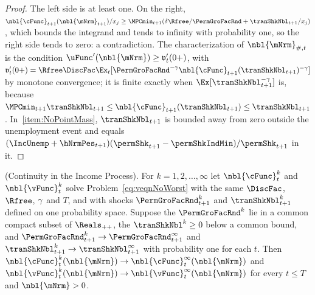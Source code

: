 \documentclass[\econtexRoot/BufferStockTheory]{subfiles}
\begin{document}
\begin{proof}
The left side is at least one.
On the right, $\nbl{\cFunc}_{t+1}(\nbl{\mNrm}_{t+1})/x_{j}\geq\MPCmin_{t+1}(\delta\Rfree/\PermGroFacRnd+\tranShkNbl_{t+1}/x_{j})$, which bounds the integrand and tends to infinity with probability one, so the right side tends to zero: a contradiction.
The characterization of $\nbl{\mNrm}_{\#,t}$ is the condition $\uFunc^{\prime}(\nbl{\mNrm})\geq\mathfrak{v}_{t}^{\prime}(0+)$, with $\mathfrak{v}_{t}^{\prime}(0+)=\Rfree\DiscFac\Ex_{t}[\PermGroFacRnd^{-\CRRA}\nbl{\cFunc}_{t+1}(\tranShkNbl_{t+1})^{-\CRRA}]$ by monotone convergence; it is finite exactly when $\Ex[\tranShkNbl_{t+1}^{-\CRRA}]$ is, because $\MPCmin_{t+1}\tranShkNbl_{t+1}\leq\nbl{\cFunc}_{t+1}(\tranShkNbl_{t+1})\leq\tranShkNbl_{t+1}$.
In~\ref{item:NoPointMass}, $\tranShkNbl_{t+1}$ is bounded away from zero outside the unemployment event and equals $(\IncUnemp+\hNrmPes_{t+1})(\permShk_{t+1}-\permShkIndMin)/\permShk_{t+1}$ in it.
\end{proof}

\begin{lemma}(Continuity in the Income Process).\label{lemma:ContinuityIncome}
For $k=1,2,\ldots,\infty$ let $\nbl{\cFunc}_{t}^{k}$ and $\nbl{\vFunc}_{t}^{k}$ solve Problem~\eqref{eq:veqnNoWorst} with the same $\DiscFac$, $\Rfree$, $\gamma$ and $T$, and with shocks $\PermGroFacRnd_{t+1}^{k}$ and $\tranShkNbl_{t+1}^{k}$ defined on one probability space.
Suppose the $\PermGroFacRnd^{k}$ lie in a common compact subset of $\Reals_{++}$, the $\tranShkNbl^{k}\geq 0$ below a common bound, and $\PermGroFacRnd_{t+1}^{k}\rightarrow\PermGroFacRnd_{t+1}^{\infty}$ and $\tranShkNbl_{t+1}^{k}\rightarrow\tranShkNbl_{t+1}^{\infty}$ with probability one for each $t$.
Then $\nbl{\cFunc}_{t}^{k}(\nbl{\mNrm})\rightarrow\nbl{\cFunc}_{t}^{\infty}(\nbl{\mNrm})$ and $\nbl{\vFunc}_{t}^{k}(\nbl{\mNrm})\rightarrow\nbl{\vFunc}_{t}^{\infty}(\nbl{\mNrm})$ for every $t\leq T$ and $\nbl{\mNrm}>0$.
\end{lemma}
\end{document}
